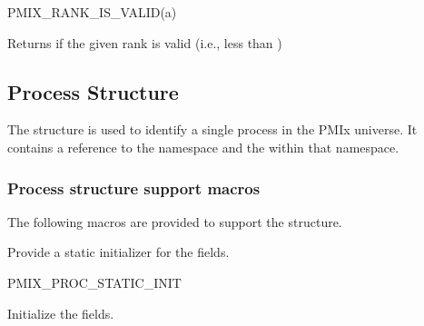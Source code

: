 \cspecificstart
\begin{codepar}
PMIX_RANK_IS_VALID(a)
\end{codepar}
\cspecificend

\begin{arglist}
\end{arglist}

Returns  if the given rank is valid (i.e., less than )

\subsection{Process Structure}

The  structure is used to identify a single process in the PMIx universe.
It contains a reference to the namespace and the  within that namespace.


\subsubsection{Process structure support macros}
The following macros are provided to support the  structure.


Provide a static initializer for the  fields.

\cspecificstart
\begin{codepar}
PMIX_PROC_STATIC_INIT
\end{codepar}
\cspecificend



Initialize the  fields.


